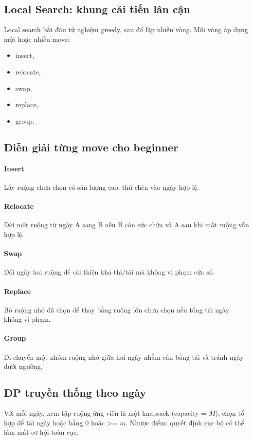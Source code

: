 \documentclass[12pt,a4paper]{article}
\begin{document}
\subsection{Local Search: khung cải tiến lân cận}
Local search bắt đầu từ nghiệm greedy, sau đó lặp nhiều vòng. Mỗi vòng áp dụng một hoặc nhiều move:
\begin{itemize}
  \item insert,
  \item relocate,
  \item swap,
  \item replace,
  \item group.
\end{itemize}

\subsection{Diễn giải từng move cho beginner}
\paragraph{Insert}
Lấy ruộng chưa chọn có sản lượng cao, thử chèn vào ngày hợp lệ.

\paragraph{Relocate}
Dời một ruộng từ ngày A sang B nếu B còn sức chứa và A sau khi mất ruộng vẫn hợp lệ.

\paragraph{Swap}
Đổi ngày hai ruộng để cải thiện khả thi/tải mà không vi phạm cửa sổ.

\paragraph{Replace}
Bỏ ruộng nhỏ đã chọn để thay bằng ruộng lớn chưa chọn nếu tổng tải ngày không vi phạm.

\paragraph{Group}
Di chuyển một nhóm ruộng nhỏ giữa hai ngày nhằm cân bằng tải và tránh ngày dưới ngưỡng.

\subsection{DP truyền thống theo ngày}
Với mỗi ngày, xem tập ruộng ứng viên là một knapsack (capacity = $M$), chọn tổ hợp để tải ngày hoặc bằng 0 hoặc >= $m$.
Nhược điểm: quyết định cục bộ có thể làm mất cơ hội toàn cục.
\end{document}
